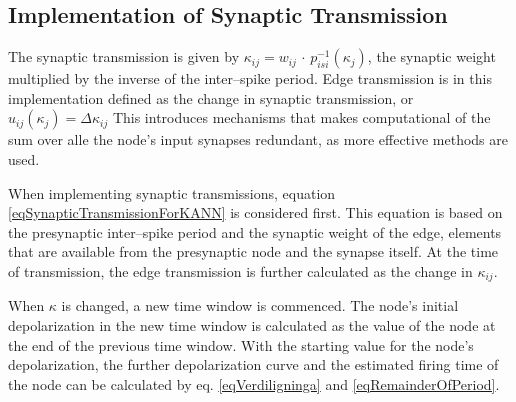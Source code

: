 



			\subsection{Implementation of Synaptic Transmission}
			\label{ssecImpOfSynTransmissionKANNN}
	
	
			The synaptic transmission is given by $\kappa_{ij} = w_{ij} \, \cdot \, p_{isi}^{-1}(\kappa_j)$, the synaptic weight multiplied by the inverse of the inter--spike period.
			Edge transmission is in this implementation defined as the change in synaptic transmission, or $u_{ij}(\kappa_j) = \Delta \kappa_{ij}$
			This introduces mechanisms that makes computational of the sum over alle the node's input synapses redundant, as more effective methods are used. %
	
			When implementing synaptic transmissions, equation \eqref{eqSynapticTransmissionForKANN} is considered first.
			This equation is based on the presynaptic inter--spike period and the synaptic weight of the edge, elements that are available from the presynaptic node and the synapse itself.
			At the time of transmission, the edge transmission is further calculated as the change in $\kappa_{ij}$.
			
			When $\kappa$ is changed, a new time window is commenced. 
			The node's initial depolarization in the new time window is calculated as the value of the node at the end of the previous time window.
			With the starting value for the node's depolarization, the further depolarization curve and the estimated firing time of the node can be calculated by eq. \eqref{eqVerdiligninga} and \eqref{eqRemainderOfPeriod}.

